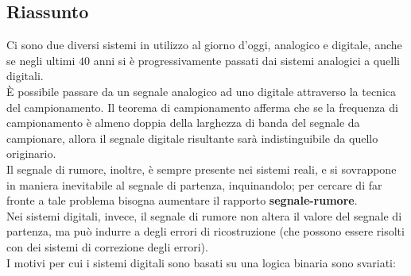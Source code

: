 \documentclass[a4paper]{extarticle}
\begin{document}
\subsection{Riassunto}
Ci sono due diversi sistemi in utilizzo al giorno d'oggi, analogico e digitale, anche se negli ultimi \(40\) anni si è progressivamente passati dai sistemi analogici a quelli digitali.\\
È possibile passare da un segnale analogico ad uno digitale attraverso la tecnica del campionamento. Il teorema di campionamento afferma che se la frequenza di campionamento è almeno doppia della larghezza di banda del segnale da campionare, allora il segnale digitale risultante sarà indistinguibile da quello originario.\\
Il segnale di rumore, inoltre, è sempre presente nei sistemi reali, e si sovrappone in maniera inevitabile al segnale di partenza, inquinandolo; per cercare di far fronte a tale problema bisogna aumentare il rapporto \textbf{segnale-rumore}.\\
Nei sistemi digitali, invece, il segnale di rumore non altera il valore del segnale di partenza, ma può indurre a degli errori di ricostruzione (che possono essere risolti con dei sistemi di correzione degli errori).\\
I motivi per cui i sistemi digitali sono basati su una logica binaria sono svariati:
\end{document}
